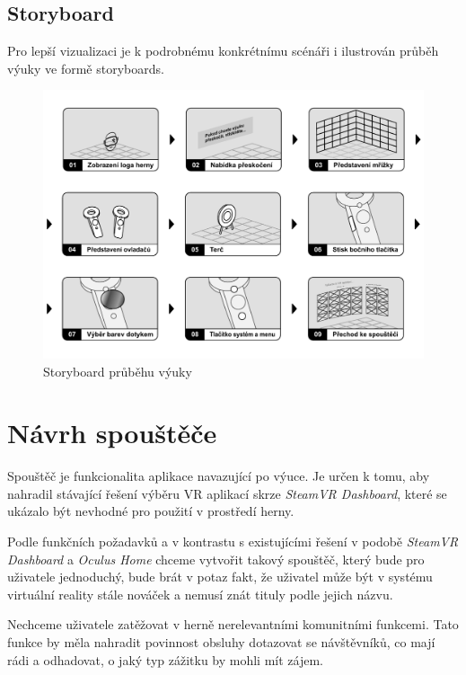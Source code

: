 \subsection{Storyboard}\label{storyboards}

Pro lepší vizualizaci je k podrobnému konkrétnímu scénáři i ilustrován
průběh výuky ve formě storyboards.

\begin{figure}[h!]
\centering
\includegraphics[width=\textwidth]{src/assets/storyboard.pdf}
\caption{Storyboard průběhu výuky}
\end{figure}

\section{Návrh spouštěče}\label{nuxe1vrh-spouux161tux11bux10de}

Spouštěč je funkcionalita aplikace navazující po výuce. Je určen k tomu,
aby nahradil stávající řešení výběru VR aplikací skrze \emph{SteamVR
Dashboard}, které se ukázalo být nevhodné pro použití v prostředí herny.

Podle funkčních požadavků a v kontrastu s existujícími řešení v podobě
\emph{SteamVR Dashboard} a \emph{Oculus Home} chceme vytvořit takový
spouštěč, který bude pro uživatele jednoduchý, bude brát v potaz fakt,
že uživatel může být v systému virtuální reality stále nováček a nemusí
znát tituly podle jejich názvu. 

Nechceme uživatele zatěžovat v herně
nerelevantními komunitními funkcemi. Tato funkce by měla nahradit
povinnost obsluhy dotazovat se návštěvníků, co mají rádi a odhadovat, o
jaký typ zážitku by mohli mít zájem.

